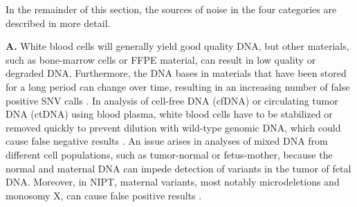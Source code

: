 In the remainder of this section, the sources of noise in the four categories are described in more detail.

\textbf{A.} White blood cells will generally yield good quality DNA, but other materials, such as bone-marrow cells or FFPE material, can result in low quality or degraded DNA. 
Furthermore, the DNA bases in materials that have been stored for a long period can change over time, resulting in an increasing number of false positive SNV calls \cite{Guyard_2017}. 
In analysis of cell-free DNA (cfDNA) or circulating tumor DNA (ctDNA) using blood plasma, white blood cells have to be stabilized or removed quickly to prevent dilution with wild-type genomic DNA, which could cause false negative results \cite{Diaz_2016}. 
An issue arises in analyses of mixed DNA from different cell populations, such as tumor-normal or fetus-mother, because the normal and maternal DNA can impede detection of variants in the tumor of fetal DNA. 
Moreover, in NIPT, maternal variants, most notably microdeletions and monosomy X, can cause false positive results \cite{Mather_2016,Reiss_2017}. 

